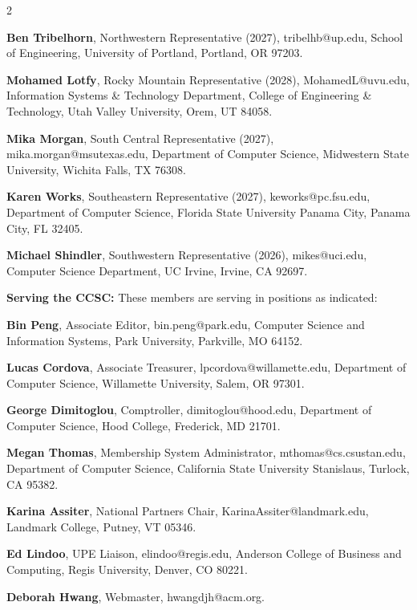 \documentclass{article}
\begin{document}
\begin{multicols}{2}
\begin{raggedright}
{\noindent
\textbf{Ben Tribelhorn}, Northwestern Representative (2027), tribelhb@up.edu,
School of Engineering, University of Portland, Portland, OR 97203.

\noindent
\textbf{Mohamed Lotfy}, Rocky Mountain Representative (2028),
MohamedL@uvu.edu, Information Systems \& Technology Department,
College of Engineering \& Technology, Utah Valley University, Orem, UT 84058.

\noindent
\textbf{Mika Morgan}, South Central Representative (2027),
mika.morgan@msutexas.edu, Department of Computer Science, Midwestern State University, Wichita Falls, TX 76308.

\noindent
\textbf{Karen Works}, Southeastern Representative (2027),
keworks@pc.fsu.edu, Department of Computer Science, Florida State University Panama City, Panama City,
FL 32405.

\noindent
\textbf{Michael Shindler}, Southwestern Representative (2026),
mikes@uci.edu, Computer Science Department, UC Irvine, Irvine, CA 92697.

\clearpage
\vspace{0.2in}
\noindent
\textbf{Serving the CCSC:} These members are serving in positions as indicated:

\noindent
\textbf{Bin Peng}, Associate Editor,
bin.peng@park.edu, Computer Science and
Information Systems, Park University, Parkville, MO 64152.

\noindent
\textbf{Lucas Cordova}, Associate Treasurer, lpcordova@willamette.edu,
Department of Computer Science, Willamette University, Salem, OR 97301.

\noindent
\textbf{George Dimitoglou}, Comptroller,
dimitoglou@hood.edu,
Department of Computer Science, Hood College, Frederick, MD 21701.

\noindent
\textbf{Megan Thomas}, Membership System Administrator,
mthomas@cs.csustan.edu, Department of Computer Science, California State University Stanislaus, Turlock, CA 95382.

\noindent
\textbf{Karina Assiter}, National Partners Chair, KarinaAssiter@landmark.edu, Landmark College, Putney, VT 05346.

\noindent
\textbf{Ed Lindoo}, UPE Liaison, elindoo@regis.edu,
Anderson College of Business and Computing, Regis University, Denver, CO 80221.

\noindent
\textbf{Deborah Hwang}, Webmaster, hwangdjh@acm.org.

} %

\end{raggedright}
\end{multicols}
\end{document}
